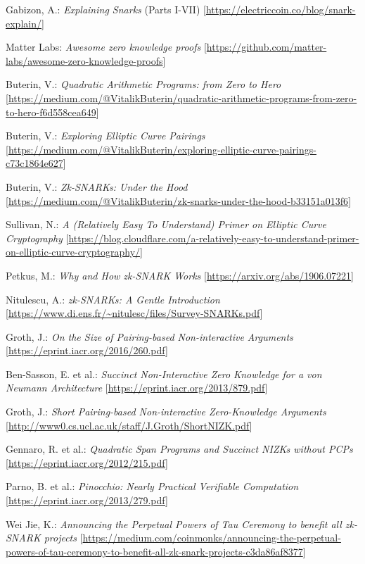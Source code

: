 \documentclass[a4paper]{article}
\begin{document}
\begin{thebibliography}{9}
\vspace{4mm}
Gabizon, A.: \textit{Explaining Snarks} (Parts I-VII) [\url{https://electriccoin.co/blog/snark-explain/}]

Matter Labs: \textit{Awesome zero knowledge proofs}  [\url{https://github.com/matter-labs/awesome-zero-knowledge-proofs}]

Buterin, V.: \textit{Quadratic Arithmetic Programs: from Zero to Hero} [\url{https://medium.com/@VitalikButerin/quadratic-arithmetic-programs-from-zero-to-hero-f6d558cea649}]

Buterin, V.: \textit{Exploring Elliptic Curve Pairings} [\url{https://medium.com/@VitalikButerin/exploring-elliptic-curve-pairings-c73c1864e627}]

Buterin, V.: \textit{Zk-SNARKs: Under the Hood} [\url{https://medium.com/@VitalikButerin/zk-snarks-under-the-hood-b33151a013f6}]

Sullivan, N.: \textit{A (Relatively Easy To Understand) Primer on Elliptic Curve Cryptography} [\url{https://blog.cloudflare.com/a-relatively-easy-to-understand-primer-on-elliptic-curve-cryptography/}]

Petkus, M.: \textit{Why and How zk-SNARK Works} [\url{https://arxiv.org/abs/1906.07221}]

Nitulescu, A.: \textit{zk-SNARKs: A Gentle Introduction} [\url{https://www.di.ens.fr/~nitulesc/files/Survey-SNARKs.pdf}]

Groth, J.: \textit{On the Size of Pairing-based Non-interactive Arguments} [\url{https://eprint.iacr.org/2016/260.pdf}]

Ben-Sasson, E. et al.: \textit{Succinct Non-Interactive Zero Knowledge for a von Neumann Architecture} [\url{https://eprint.iacr.org/2013/879.pdf}]

Groth, J.: \textit{Short Pairing-based Non-interactive Zero-Knowledge Arguments} [\url{http://www0.cs.ucl.ac.uk/staff/J.Groth/ShortNIZK.pdf}]

Gennaro, R. et al.: \textit{Quadratic Span Programs and Succinct NIZKs without PCPs} [\url{https://eprint.iacr.org/2012/215.pdf}]

Parno, B. et al.: \textit{Pinocchio: Nearly Practical Verifiable Computation} [\url{https://eprint.iacr.org/2013/279.pdf}]

Wei Jie, K.: \textit{Announcing the Perpetual Powers of Tau Ceremony to benefit all zk-SNARK projects} [\url{https://medium.com/coinmonks/announcing-the-perpetual-powers-of-tau-ceremony-to-benefit-all-zk-snark-projects-c3da86af8377}]


\end{thebibliography}
\end{document}

